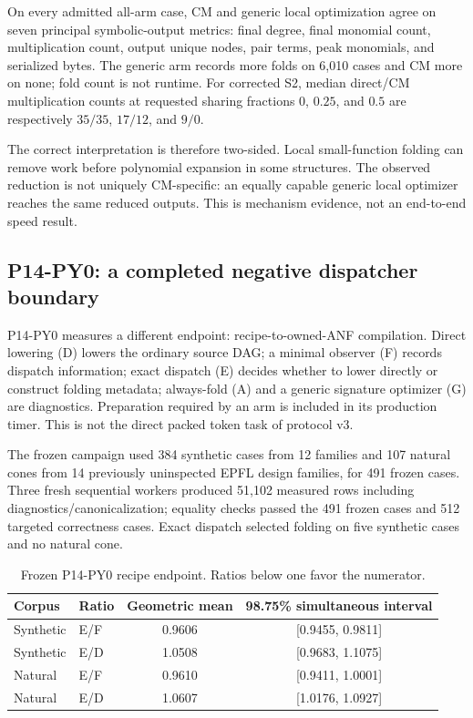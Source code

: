 \documentclass[10pt]{article}
\theoremstyle{plain}
\theoremstyle{definition}
\theoremstyle{remark}
\begin{document}
On every admitted all-arm case, CM and generic local optimization agree on seven principal symbolic-output metrics: final degree, final monomial count, multiplication count, output unique nodes, pair terms, peak monomials, and serialized bytes. The generic arm records more folds on 6,010 cases and CM more on none; fold count is not runtime. For corrected S2, median direct/CM multiplication counts at requested sharing fractions $0$, $0.25$, and $0.5$ are respectively $35/35$, $17/12$, and $9/0$.

The correct interpretation is therefore two-sided. Local small-function folding can remove work before polynomial expansion in some structures. The observed reduction is not uniquely CM-specific: an equally capable generic local optimizer reaches the same reduced outputs. This is mechanism evidence, not an end-to-end speed result.

\subsection{P14-PY0: a completed negative dispatcher boundary}

P14-PY0 measures a different endpoint: recipe-to-owned-ANF compilation. Direct lowering (D) lowers the ordinary source DAG; a minimal observer (F) records dispatch information; exact dispatch (E) decides whether to lower directly or construct folding metadata; always-fold (A) and a generic signature optimizer (G) are diagnostics. Preparation required by an arm is included in its production timer. This is not the direct packed token task of protocol v3.

The frozen campaign used 384 synthetic cases from 12 families and 107 natural cones from 14 previously uninspected EPFL design families, for 491 frozen cases. Three fresh sequential workers produced 51,102 measured rows including diagnostics/canonicalization; equality checks passed the 491 frozen cases and 512 targeted correctness cases. Exact dispatch selected folding on five synthetic cases and no natural cone.

\begin{table}[t]
\centering
\small
\begin{tabular}{@{}llcc@{}}
\toprule
\textbf{Corpus} & \textbf{Ratio} & \textbf{Geometric mean} & \textbf{98.75\% simultaneous interval}\\
\midrule
Synthetic & E/F & 0.9606 & [0.9455, 0.9811]\\
Synthetic & E/D & 1.0508 & [0.9683, 1.1075]\\
Natural & E/F & 0.9610 & [0.9411, 1.0001]\\
Natural & E/D & 1.0607 & [1.0176, 1.0927]\\
\bottomrule
\end{tabular}
\caption{Frozen P14-PY0 recipe endpoint. Ratios below one favor the numerator.}
\label{tab:p14}
\end{table}
\end{document}
